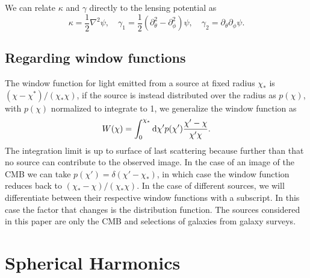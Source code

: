 \documentclass[11pt]{article} %
\DeclareRobustCommand{\d}{\ifmmode\text{d}\else d\fi}
\begin{document}
We can relate $\kappa$ and $\gamma$ directly to the lensing potential as
\begin{equation}
    \kappa = \frac{1}{2}\nabla^2\psi, \quad \gamma_1 = \frac{1}{2}(\partial_\theta^2 - \partial_\phi^2)\psi, \quad \gamma_2 = \partial_\theta\partial_\phi \psi.
\end{equation}

\subsection{Regarding window functions}
The window function for light emitted from a source at fixed radius $\chi_*$ is $(\chi-\chi^*)/(\chi_*\chi)$, if the source is instead distributed over the radius as $p(\chi)$, with $p(\chi)$ normalized to integrate to 1, we generalize the window function as
\begin{equation*}
    W(\chi) = \int_0^{\chi_*}\d\chi' p(\chi')\frac{\chi'-\chi}{\chi'\chi}.
\end{equation*}
The integration limit is up to surface of last scattering because further than that no source can contribute to the observed image. In the case of an image of the CMB we can take $p(\chi')=\delta(\chi'-\chi_*)$, in which case the window function reduces back to $(\chi_*-\chi)/(\chi_*\chi)$. In the case of different sources, we will differentiate between their respective window functions with a subscript. In this case the factor that changes is the distribution function. The sources considered in this paper are only the CMB and selections of galaxies from galaxy surveys. 

\section{Spherical Harmonics}
\end{document}
